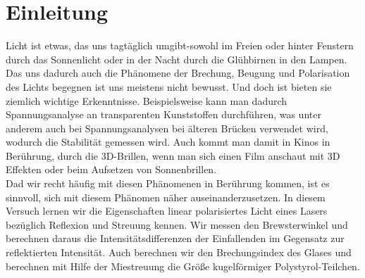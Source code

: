 

\chapter{Einleitung}
\label{chap:einleitung}
Licht ist etwas, das uns tagtäglich umgibt-sowohl im Freien oder hinter Fenstern durch das Sonnenlicht oder in der Nacht durch die Glühbirnen in den Lampen. Das uns dadurch auch die Phänomene der Brechung, Beugung und Polarisation des Lichts begegnen ist uns meistens nicht bewusst. Und doch ist bieten sie  ziemlich wichtige Erkenntnisse. Beispielsweise kann man dadurch Spannungsanalyse an transparenten Kunststoffen durchführen, was unter anderem auch bei Spannungsanalysen bei älteren Brücken verwendet wird, wodurch die Stabilität gemessen wird. Auch kommt man damit in Kinos in Berührung, durch die 3D-Brillen, wenn man sich einen Film anschaut mit 3D Effekten oder beim Aufsetzen von Sonnenbrillen. \\
Dad wir recht häufig mit diesen Phänomenen in Berührung kommen, ist es sinnvoll, sich mit diesem Phänomen näher auseinanderzusetzen. In diesem Versuch lernen wir die Eigenschaften linear polarisiertes Licht eines Lasers bezüglich Reflexion und Streuung kennen. Wir messen den Brewsterwinkel und berechnen daraus die Intensitätsdifferenzen der Einfallenden im Gegensatz zur reflektierten Intensität. Auch berechnen wir den Brechungsindex des Glases und berechnen mit Hilfe der Miestreuung die Größe kugelförmiger Polystyrol-Teilchen. 
